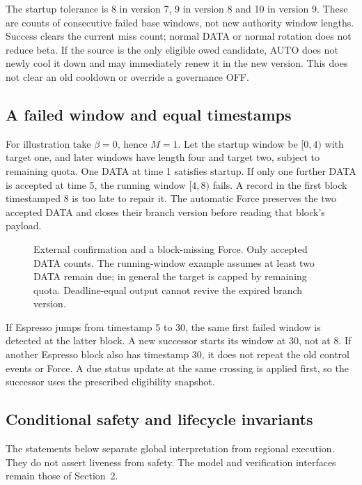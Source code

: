 \documentclass[11pt,a4paper]{article}
\begin{document}
The startup tolerance is 8 in version 7, 9 in version 8 and 10 in
version 9. These are counts of consecutive failed base windows, not
new authority window lengths. Success clears the current miss count;
normal DATA or normal rotation does not reduce beta. If the source is
the only eligible owed candidate, AUTO does not newly cool it down and
may immediately renew it in the new version. This does not clear an old
cooldown or override a governance OFF.

\subsection{A failed window and equal timestamps}
\label{sec:window-example}
For illustration take $\beta=0$, hence $M=1$. Let the startup window
be $[0,4)$ with target one,
and later windows have length four and target two, subject to remaining
quota. One DATA at time 1 satisfies startup. If only one further DATA
is accepted at time 5, the running window $[4,8)$ fails.
A record in the first block timestamped 8 is too late to repair it.
The automatic Force preserves the two accepted DATA and closes their
branch version before reading that block's payload.

\begin{figure}[htbp]\centering

\caption{External confirmation and a block-missing Force. Only accepted
DATA counts. The running-window example assumes at least two DATA
remain due; in general the target is capped by remaining quota.
Deadline-equal output cannot revive the expired branch version.}
\label{fig:observer-finality}
\end{figure}
\FloatBarrier

If Espresso jumps from timestamp 5 to 30, the same first failed window
is detected at the latter block. A new successor starts its window at
30, not at 8. If another Espresso block also has timestamp 30, it does
not repeat the old control events or Force. A due status update at the
same crossing is applied first, so the successor uses the prescribed
eligibility snapshot.

\subsection{Conditional safety and lifecycle invariants}
\label{sec:safety-argument}
The statements below separate global interpretation from regional
execution. They do not assert liveness from safety. The model and
verification interfaces remain those of Section~2.
\end{document}
